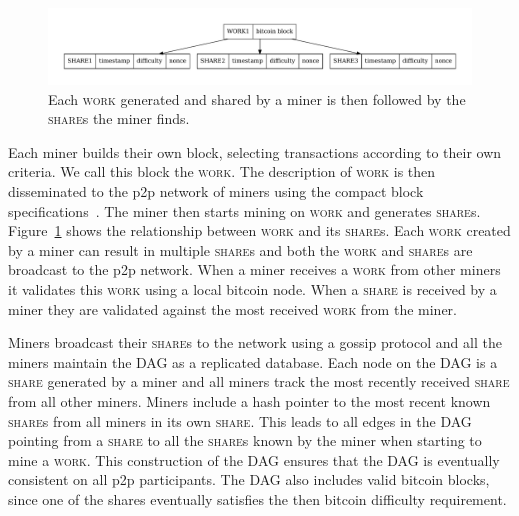 \documentclass{article}
\begin{document}
\begin{figure}
  \begin{center}
    \includegraphics[width=1.0\textwidth]{work-share}
    \caption{Each \textsc{work} generated and shared by a miner is then
      followed by the \textsc{share}s the miner finds.}\label{fig:work-share}
    \end{center}
\end{figure}

Each miner builds their own block, selecting transactions according to
their own criteria. We call this block the \textsc{work}. The
description of \textsc{work} is then disseminated to the p2p network
of miners using the compact block
specifications~\cite{compact-blocks}. The miner then starts mining on
\textsc{work} and generates
\textsc{share}s. Figure~\ref{fig:work-share} shows the relationship
between \textsc{work} and its \textsc{share}s. Each \textsc{work}
created by a miner can result in multiple \textsc{share}s and both the
\textsc{work} and \textsc{share}s are broadcast to the p2p
network. When a miner receives a \textsc{work} from other miners it
validates this \textsc{work} using a local bitcoin node. When a
\textsc{share} is received by a miner they are validated against the
most received \textsc{work} from the miner.

Miners broadcast their \textsc{share}s to the network using a gossip
protocol and all the miners maintain the DAG as a replicated
database. Each node on the DAG is a \textsc{share} generated by a
miner and all miners track the most recently received \textsc{share}
from all other miners. Miners include a hash pointer to the most
recent known \textsc{share}s from all miners in its own
\textsc{share}. This leads to all edges in the DAG pointing from a
\textsc{share} to all the \textsc{share}s known by the miner when
starting to mine a \textsc{work}. This construction of the DAG ensures
that the DAG is eventually consistent on all p2p participants. The DAG
also includes valid bitcoin blocks, since one of the shares eventually
satisfies the then bitcoin difficulty requirement.
\end{document}
